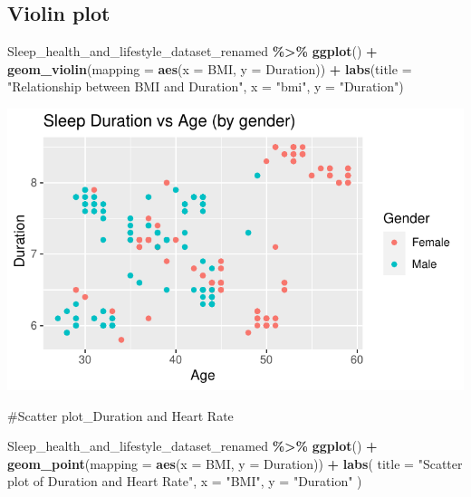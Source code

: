 \documentclass[
  11pt,
]{article}
\newenvironment{Shaded}{\begin{snugshade}}{\end{snugshade}}
\newcommand{\AttributeTok}[1]{\textcolor[rgb]{0.13,0.29,0.53}{#1}}
\newcommand{\FunctionTok}[1]{\textcolor[rgb]{0.13,0.29,0.53}{\textbf{#1}}}
\newcommand{\NormalTok}[1]{#1}
\newcommand{\SpecialCharTok}[1]{\textcolor[rgb]{0.81,0.36,0.00}{\textbf{#1}}}
\newcommand{\StringTok}[1]{\textcolor[rgb]{0.31,0.60,0.02}{#1}}
\begin{document}
\hypertarget{violin-plot-1}{%
\subsection{Violin plot}\label{violin-plot-1}}

\begin{Shaded}
\begin{Highlighting}[]
\NormalTok{Sleep\_health\_and\_lifestyle\_dataset\_renamed }\SpecialCharTok{\%\textgreater{}\%}
  \FunctionTok{ggplot}\NormalTok{() }\SpecialCharTok{+}
    \FunctionTok{geom\_violin}\NormalTok{(}\AttributeTok{mapping =} \FunctionTok{aes}\NormalTok{(}\AttributeTok{x =}\NormalTok{ BMI, }\AttributeTok{y =}\NormalTok{ Duration)) }\SpecialCharTok{+}
    \FunctionTok{labs}\NormalTok{(}\AttributeTok{title =} \StringTok{"Relationship between BMI and Duration"}\NormalTok{, }\AttributeTok{x =} \StringTok{"bmi"}\NormalTok{, }\AttributeTok{y =} \StringTok{"Duration"}\NormalTok{)}
\end{Highlighting}
\end{Shaded}

\begin{center}\includegraphics[width=0.7\linewidth]{SleepHelath_files/figure-latex/unnamed-chunk-28-1} \end{center}

\#Scatter plot\_Duration and Heart Rate

\begin{Shaded}
\begin{Highlighting}[]
\NormalTok{Sleep\_health\_and\_lifestyle\_dataset\_renamed    }\SpecialCharTok{\%\textgreater{}\%} 
\FunctionTok{ggplot}\NormalTok{()    }\SpecialCharTok{+}
\FunctionTok{geom\_point}\NormalTok{(}\AttributeTok{mapping =} \FunctionTok{aes}\NormalTok{(}\AttributeTok{x =}\NormalTok{ BMI, }\AttributeTok{y =}\NormalTok{ Duration))    }\SpecialCharTok{+} 
\FunctionTok{labs}\NormalTok{(}
\AttributeTok{title =} \StringTok{"Scatter plot of Duration and Heart Rate"}\NormalTok{, }
\AttributeTok{x =} \StringTok{"BMI"}\NormalTok{,}
\AttributeTok{y =} \StringTok{"Duration"} 
\NormalTok{)}
\end{Highlighting}
\end{Shaded}
\end{document}
